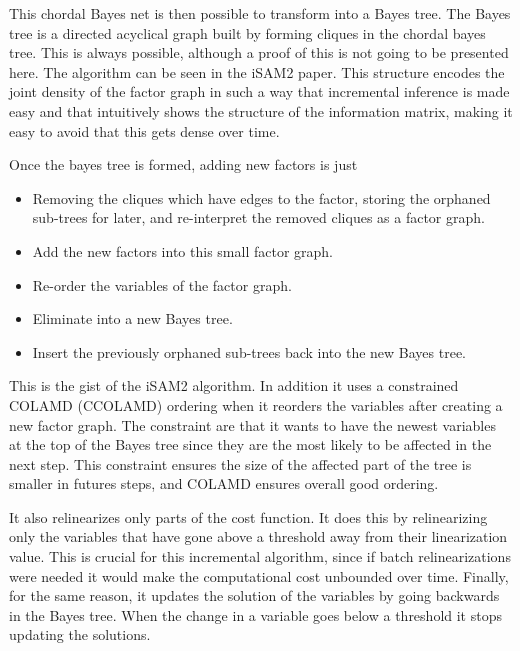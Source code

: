 This chordal Bayes net is then possible to transform into a Bayes tree.  The Bayes tree is a directed acyclical graph built by forming cliques in the chordal bayes tree. This is always possible, although a proof of this is not going to be presented here. The algorithm can be seen in the iSAM2 paper\cite{iSAM2}. This structure encodes the joint density of the factor graph in such a way that incremental inference is made easy and that intuitively shows the structure of the information matrix, making it easy to avoid that this gets dense over time.

Once the bayes tree is formed, adding new factors is just 

\begin{itemize}
    \item Removing the cliques which have edges to the factor, storing the orphaned sub-trees for later, and re-interpret the removed cliques as a factor graph.
    \item Add the new factors into this small factor graph.
    \item Re-order the variables of the factor graph.
    \item Eliminate into a new Bayes tree.
    \item Insert the previously orphaned sub-trees back into the new Bayes tree.
\end{itemize}

This is the gist of the iSAM2 algorithm. In addition it uses a constrained COLAMD (CCOLAMD) ordering when it reorders the variables after creating a new factor graph. The constraint are that it wants to have the newest variables at the top of the Bayes tree since they are the most likely to be affected in the next step. This constraint ensures the size of the affected part of the tree is smaller in futures steps, and COLAMD ensures overall good ordering. 

It also relinearizes only parts of the cost function. It does this by relinearizing only the variables that have gone above a threshold away from their linearization value. This is crucial for this incremental algorithm, since if batch relinearizations were needed it would make the computational cost unbounded over time. Finally, for the same reason, it updates the solution of the variables by going backwards in the Bayes tree. When the change in a variable goes below a threshold it stops updating the solutions. 